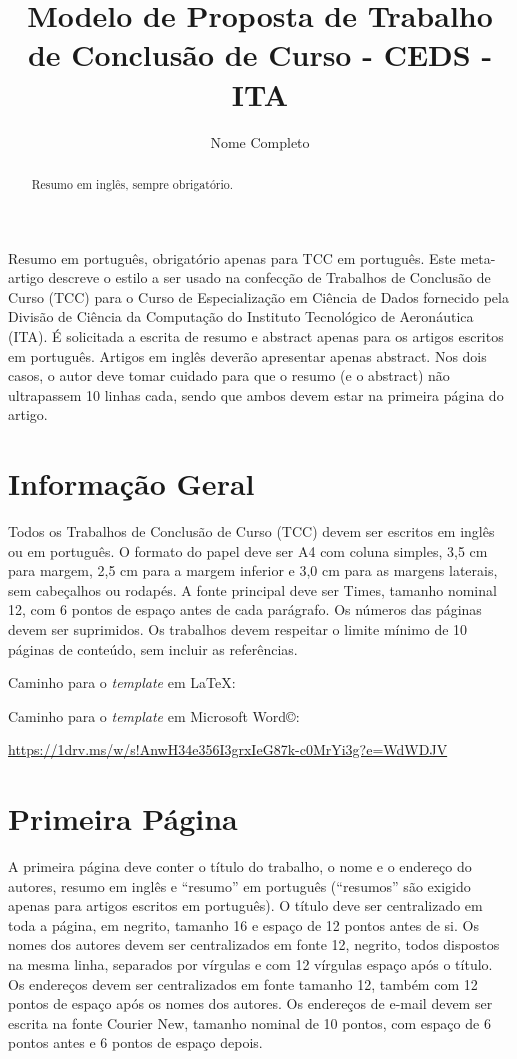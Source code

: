 \documentclass[12pt]{article}
\title{Modelo de Proposta de Trabalho de Conclusão de Curso - CEDS - ITA}
\author{Nome Completo\inst{1}}
\begin{document}
 

\maketitle

\begin{abstract}
  Resumo em inglês, sempre obrigatório.
\end{abstract}
     
\begin{resumo} 
  Resumo em português, obrigatório apenas para TCC em português. Este meta-artigo descreve o estilo a ser usado na confecção de Trabalhos de Conclusão de Curso (TCC) para o Curso de Especialização em Ciência de Dados fornecido pela Divisão de Ciência da Computação do Instituto Tecnológico de Aeronáutica (ITA). É solicitada a escrita de resumo e abstract apenas para os artigos escritos em português. Artigos em inglês deverão apresentar apenas abstract.   Nos dois casos, o autor deve tomar cuidado para que o resumo (e o abstract) não ultrapassem 10 linhas cada, sendo que ambos devem estar na primeira
  página do artigo.
\end{resumo}

\section{Informação Geral}

Todos os Trabalhos de Conclusão de Curso (TCC)  devem ser escritos em inglês ou em português. O formato do papel deve ser A4 com coluna simples, 3,5 cm para margem, 2,5 cm para a margem inferior e 3,0 cm para as margens laterais, sem cabeçalhos ou rodapés. A fonte principal deve ser Times, tamanho nominal 12, com 6 pontos de espaço antes de cada parágrafo. Os números das páginas devem ser suprimidos. Os trabalhos devem respeitar o limite mínimo de 10 páginas de conteúdo, sem incluir as referências.

Caminho para o \textit{template} em LaTeX:


Caminho para o \textit{template} em Microsoft Word\copyright:

{\small \url{https://1drv.ms/w/s!AnwH34e356I3grxIeG87k-c0MrYi3g?e=WdWDJV}}

\section{Primeira Página} \label{sec:firstpage}

A primeira página deve conter o título do trabalho, o nome e o endereço do
autores, resumo em inglês e ``resumo'' em português (``resumos'' são
exigido apenas para artigos escritos em português). O título deve ser centralizado
em toda a página, em negrito, tamanho 16 e espaço de 12 pontos
antes de si. Os nomes dos autores devem ser centralizados em fonte 12, negrito, todos dispostos na mesma linha, separados por vírgulas e com 12 vírgulas
espaço após o título. Os endereços devem ser centralizados em fonte tamanho 12, também com 12 pontos de espaço após os nomes dos autores. Os endereços de e-mail devem ser escrita na fonte Courier New, tamanho nominal de 10 pontos, com espaço de 6 pontos antes e 6 pontos de espaço depois.
\end{document}
